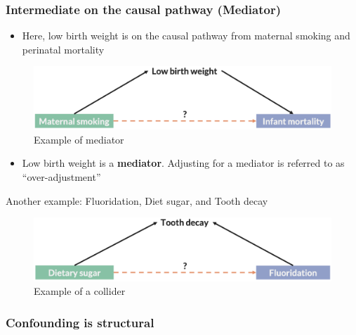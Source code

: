\documentclass[
]{book}
\providecommand{\tightlist}{%
  \setlength{\itemsep}{0pt}\setlength{\parskip}{0pt}}
\begin{document}
\hypertarget{intermediate-on-the-causal-pathway-mediator}{%
\subsubsection{Intermediate on the causal pathway (Mediator)}\label{intermediate-on-the-causal-pathway-mediator}}

\begin{itemize}
\tightlist
\item
  Here, low birth weight is on the causal pathway from maternal smoking and perinatal mortality
\end{itemize}

\begin{figure}

{\centering \includegraphics[width=1\linewidth]{img/confounding/mediator_example} 

}

\caption{Example of mediator}\label{fig:unnamed-chunk-10}
\end{figure}

\begin{itemize}
\tightlist
\item
  Low birth weight is a \textbf{mediator}. Adjusting for a mediator is referred to as ``over-adjustment''
\end{itemize}

Another example: Fluoridation, Diet sugar, and Tooth decay

\begin{figure}

{\centering \includegraphics[width=1\linewidth]{img/confounding/overadjusting_example} 

}

\caption{Example of a collider}\label{fig:unnamed-chunk-11}
\end{figure}

\hypertarget{confounding-is-structural}{%
\subsubsection{Confounding is structural}\label{confounding-is-structural}}
\end{document}
